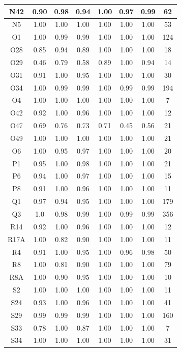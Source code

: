\documentclass[10pt,onecolumn,letterpaper]{article}
\begin{document}
\begin{longtable}{|c|c|c|c|c|c|c|c|}
		N42 & 0.90 & 0.98 & 0.94   &1.00&0.97&0.99&   62 \\ \hline
		N5 & 1.00 & 1.00 & 1.00   &1.00&1.00&1.00&   53 \\ \hline
		O1 & 1.00 & 0.99 & 0.99  &1.00&1.00&1.00& 124 \\ \hline
		O28 & 0.85 & 0.94 & 0.89    &1.00&1.00&1.00& 18 \\ \hline
		O29 & 0.46 & 0.79 & 0.58    &0.89&1.00&0.94& 14 \\ \hline
		O31 & 0.91 & 1.00 & 0.95   &1.00&1.00&1.00&   30 \\ \hline
		O34 & 1.00 & 0.99 & 0.99   &1.00&0.99&0.99& 194 \\ \hline
		O4 & 1.00 & 1.00 & 1.00    &1.00&1.00&1.00&   7 \\ \hline
		O42 & 0.92 & 1.00 & 0.96    &1.00&1.00&1.00& 12 \\ \hline
		O47 & 0.69 & 0.76 & 0.73    &0.71&0.45&0.56&  21 \\ \hline
		O49 & 1.00 & 1.00 & 1.00    &1.00&1.00&1.00&  21 \\ \hline
		O6 & 1.00 & 0.95 & 0.97   &1.00&1.00&1.00&   20 \\ \hline
		P1 & 0.95 & 1.00 & 0.98   &1.00&1.00&1.00&   21 \\ \hline
		P6 & 0.94 & 1.00 & 0.97    &1.00&1.00&1.00& 15 \\ \hline
		P8 & 0.91 & 1.00 & 0.96    &1.00&1.00&1.00& 11 \\ \hline
		Q1 & 0.97 & 0.94 & 0.95   &1.00&1.00&1.00& 179 \\ \hline
		Q3 & 1.0 & 0.98 & 0.99   &1.00&0.99&0.99& 356 \\ \hline
		R14 & 0.92 & 1.00 & 0.96    &1.00&1.00&1.00& 12 \\ \hline
		R17A & 1.00 & 0.82 & 0.90    &1.00&1.00&1.00& 11 \\ \hline
		R4 & 0.91 & 1.00 & 0.95   &1.00&0.96&0.98&   50 \\ \hline
		R8 & 1.00 & 0.81 & 0.90  &1.00&1.00&1.00&   79 \\ \hline
		R8A & 1.00 & 0.90 & 0.95    &1.00&1.00&1.00& 10 \\ \hline
		S2 & 1.00 & 1.00 & 1.00    &1.00&1.00&1.00& 11 \\ \hline
		S24 & 0.93 & 1.00 & 0.96   &1.00&1.00&1.00&  41 \\ \hline
		S29 & 0.99 & 0.99 & 0.99   &1.00&1.00&1.00& 160 \\ \hline
		S33 & 0.78 & 1.00 & 0.87   &1.00&1.00&1.00&  7 \\ \hline
		S34 & 1.00 & 1.00 & 1.00   &1.00&1.00&1.00&   31 \\ \hline

\end{longtable}
\end{document}
